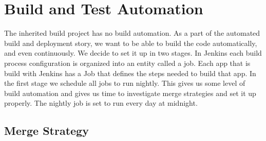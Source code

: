 \section{Build and Test Automation}\label{sec:build_automation}
The inherited build project has no build automation. As a part of the automated build and deployment story, we want to be able to build the code automatically, and even continuously. We decide to set it up in two stages. In Jenkins each build process configuration is organized into an entity called a job. Each app that is build with Jenkins has a Job that defines the steps needed to build that app. In the first stage we schedule all jobs to run nightly. This gives us some level of build automation and gives us time to investigate merge strategies and set it up properly. The nightly job is set to run every day at midnight.

\subsection{Merge Strategy}\label{sec:branching_strategy}

